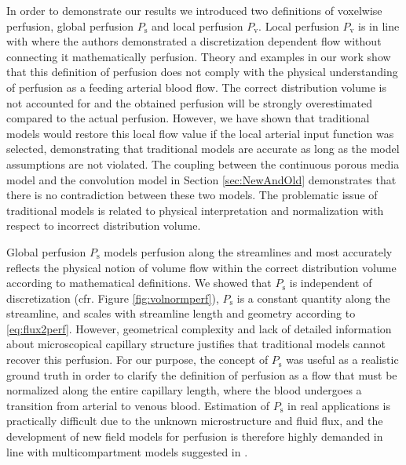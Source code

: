 \documentclass[final,5p,times,twocolumn]{elsarticle}
\begin{document}
	In order to demonstrate our results we introduced two definitions of voxelwise perfusion, global perfusion $P_{\mathrm{s}}$ and local perfusion $P_{\mathrm{v}}$. Local perfusion $P_{\mathrm{v}}$ is in line with \cite{Guibert2013} where the authors demonstrated a discretization dependent flow without connecting it mathematically perfusion. Theory and examples in our work show that this definition of perfusion does not comply with the physical understanding of perfusion as a feeding arterial blood flow. The correct distribution volume is not accounted for and the obtained perfusion will be strongly overestimated compared to the actual perfusion. However, we have shown that traditional models would restore this local flow value if the local arterial input function was selected, demonstrating that traditional models are accurate as long as the model assumptions are not violated. 	The coupling between the continuous porous media model and the convolution model in Section \ref{sec:NewAndOld} demonstrates that there is no contradiction between these two models. The problematic issue of traditional models is related to physical interpretation and normalization with respect to incorrect distribution volume.



	Global perfusion $P_{\mathrm{s}}$ models perfusion along the streamlines and most accurately reflects the physical notion of volume flow within the correct distribution volume according to mathematical definitions. We showed that $P_{\mathrm{s}}$ is independent of discretization (cfr. Figure \ref{fig:volnormperf}), $P_{\mathrm{s}}$ is a constant quantity along the streamline, and scales with streamline length and geometry according to \eqref{eq:flux2perf}.
	However, geometrical complexity and lack of detailed information about microscopical capillary structure justifies that traditional models cannot recover this perfusion. 
	For our purpose, the concept of $P_{\mathrm{s}}$ was useful as a realistic ground truth in order to clarify the definition of perfusion as a flow that must be normalized along the entire capillary length, where the blood undergoes a transition from arterial to venous blood. Estimation of $P_{\mathrm{s}}$ in real applications is practically difficult due to the unknown microstructure and fluid flux, and the development of new field models for perfusion is therefore highly demanded in line with multicompartment models suggested in \cite{sourbron14,Michler2013}. 
\end{document}
